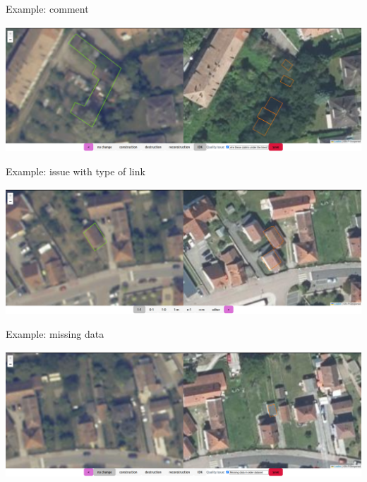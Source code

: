 \documentclass{beamer}
\begin{document}
\begin{frame}{Example: comment}
\begin{center}
	\includegraphics[width=\linewidth]{figures/example_comment.png}
\end{center}
\end{frame}

\begin{frame}{Example: issue with type of link}
\begin{center}
	\includegraphics[width=\linewidth]{figures/example_whichlink.png}
\end{center}
\end{frame}


\begin{frame}{Example: missing data}
\begin{center}
	\includegraphics[width=\linewidth]{figures/example_missingdata.png}
\end{center}
\end{frame}
\end{document}

